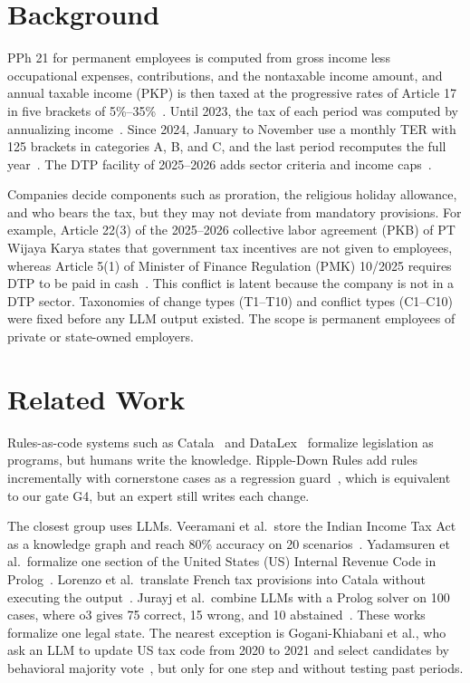 \documentclass[conference]{IEEEtran}
\begin{document}
\section{Background}
\label{sec:masalah}
PPh 21 for permanent employees is computed from gross income less occupational expenses, contributions, and the nontaxable income amount, and annual taxable income (PKP) is then taxed at the progressive rates of Article 17 in five brackets of 5\%--35\%~\cite{uu7_2021,pmk101_2016}. Until 2023, the tax of each period was computed by annualizing income~\cite{per16_2016}. Since 2024, January to November use a monthly TER with 125 brackets in categories A, B, and C, and the last period recomputes the full year~\cite{pp58_2023,pmk168_2023}. The DTP facility of 2025--2026 adds sector criteria and income caps~\cite{pmk10_2025,pmk105_2025}.

Companies decide components such as proration, the religious holiday allowance, and who bears the tax, but they may not deviate from mandatory provisions. For example, Article 22(3) of the 2025--2026 collective labor agreement (PKB) of PT Wijaya Karya states that government tax incentives are not given to employees, whereas Article 5(1) of Minister of Finance Regulation (PMK) 10/2025 requires DTP to be paid in cash~\cite{pmk10_2025}. This conflict is latent because the company is not in a DTP sector. Taxonomies of change types (T1--T10) and conflict types (C1--C10) were fixed before any LLM output existed. The scope is permanent employees of private or state-owned employers.

\section{Related Work}
\label{sec:terkait}
Rules-as-code systems such as Catala~\cite{merigoux2021catala} and DataLex~\cite{mowbray2023scaling} formalize legislation as programs, but humans write the knowledge. Ripple-Down Rules add rules incrementally with cornerstone cases as a regression guard~\cite{compton2021rdr}, which is equivalent to our gate G4, but an expert still writes each change.

The closest group uses LLMs. Veeramani et al.\ store the Indian Income Tax Act as a knowledge graph and reach 80\% accuracy on 20 scenarios~\cite{veeramani2026neurosymbolic}. Yadamsuren et al.\ formalize one section of the United States (US) Internal Revenue Code in Prolog~\cite{yadamsuren2026formalization}. Lorenzo et al.\ translate French tax provisions into Catala without executing the output~\cite{lorenzo2025translating}. Jurayj et al.\ combine LLMs with a Prolog solver on 100 cases, where o3 gives 75 correct, 15 wrong, and 10 abstained~\cite{jurayj2026tax}. These works formalize one legal state. The nearest exception is Gogani-Khiabani et al., who ask an LLM to update US tax code from 2020 to 2021 and select candidates by behavioral majority vote~\cite{goganikhiabani2025maintaining}, but only for one step and without testing past periods.
\end{document}
